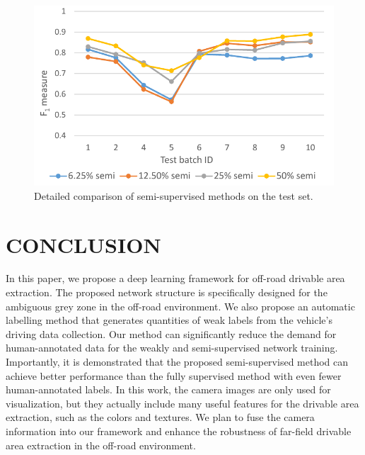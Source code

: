 \documentclass[letterpaper, 10 pt, conference]{ieeeconf}  %
\begin{document}
\begin{figure}[h]
	\centering
	\includegraphics[scale=0.5]{semiSupvisedResult.pdf}
	\caption{Detailed comparison of semi-supervised methods on the test set.}
	\label{fig:semi_curve}
	\vspace{-4mm}
\end{figure}

\vspace{-4mm}
\section{CONCLUSION}   \label{sec:conlusion}
In this paper, we propose a deep learning framework for off-road drivable area extraction. The proposed network structure is specifically designed for the ambiguous grey zone in the off-road environment. We also propose an automatic labelling method that generates quantities of weak labels from the vehicle's driving data collection. Our method can significantly reduce the demand for human-annotated data for the weakly and semi-supervised network training.
Importantly, it is demonstrated that the proposed semi-supervised method can achieve better performance than the fully supervised method with even fewer human-annotated labels. In this work, the camera images are only used for visualization, but they actually include many useful features for the drivable area extraction, such as the colors and textures. We plan to fuse the camera information into our framework and enhance the robustness of far-field drivable area extraction in the off-road environment.

\end{document}
